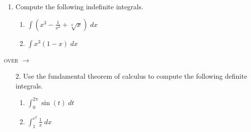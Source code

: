 \documentclass[11pt]{article}
\begin{document}
\pagestyle{empty}
\newsavebox{\quizfront}
\begin{lrbox}{\quizfront}
\begin{minipage}[top][4.5in][t]{\textwidth} \setlength{\parindent}{1.5em}
\drawtitle
\vspace{-0.5in}
\begin{enumerate}

\item Compute the following indefinite integrals.
  \begin{enumerate}
  \item $\displaystyle\int \left( x^3 - \frac{1}{x^2} +
    \sqrt[4]{x}\right)\;dx$
    
    \vfill

  \item $\displaystyle\int x^3\left( 1 - x\right)\;dx$

    \vfill

  \end{enumerate}

\end{enumerate}

\hfill \textsc{over} $\longrightarrow$

\end{minipage}
\end{lrbox}

\newsavebox{\quizback}
\begin{lrbox}{\quizback}
\begin{minipage}[top][4.5in][t]{\textwidth} \setlength{\parindent}{1.5em}
\begin{enumerate}
\item[2.] Use the fundamental theorem of calculus to compute the following 
definite integrals.
  \begin{enumerate}
  \item $\displaystyle\int_0^{2\pi} \sin(t)\;dt$
    
    \vfill


  \item $\displaystyle\int_1^{e^2} \frac{1}{x}\;dx$

    \vfill

  \end{enumerate}
  
  


\end{enumerate}
\end{minipage}
\end{lrbox}

\noindent \usebox{\quizfront}
\vfill
\noindent \usebox{\quizfront}

\pagebreak
\noindent \usebox{\quizback}
\vfill
\noindent \usebox{\quizback}
\end{document}
